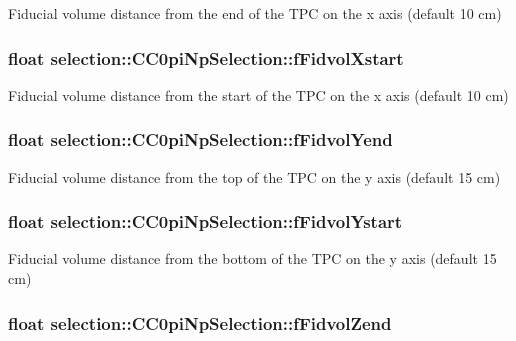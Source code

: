 Fiducial volume distance from the end of the T\-P\-C on the x axis (default 10 cm) \hypertarget{classselection_1_1CC0piNpSelection_a783e7f9dcd42c083658870f7d23931da}{
\subsubsection[{f\-Fidvol\-Xstart}]{\setlength{\rightskip}{0pt plus 5cm}float selection\-::\-C\-C0pi\-Np\-Selection\-::f\-Fidvol\-Xstart\hspace{0.3cm}{\ttfamily [private]}}}\label{classselection_1_1CC0piNpSelection_a783e7f9dcd42c083658870f7d23931da}
Fiducial volume distance from the start of the T\-P\-C on the x axis (default 10 cm) \hypertarget{classselection_1_1CC0piNpSelection_a4732dc1091cb1881c741d57f999b5035}{
\subsubsection[{f\-Fidvol\-Yend}]{\setlength{\rightskip}{0pt plus 5cm}float selection\-::\-C\-C0pi\-Np\-Selection\-::f\-Fidvol\-Yend\hspace{0.3cm}{\ttfamily [private]}}}\label{classselection_1_1CC0piNpSelection_a4732dc1091cb1881c741d57f999b5035}
Fiducial volume distance from the top of the T\-P\-C on the y axis (default 15 cm) \hypertarget{classselection_1_1CC0piNpSelection_ac59a66f695af8314018029e4480db16a}{
\subsubsection[{f\-Fidvol\-Ystart}]{\setlength{\rightskip}{0pt plus 5cm}float selection\-::\-C\-C0pi\-Np\-Selection\-::f\-Fidvol\-Ystart\hspace{0.3cm}{\ttfamily [private]}}}\label{classselection_1_1CC0piNpSelection_ac59a66f695af8314018029e4480db16a}
Fiducial volume distance from the bottom of the T\-P\-C on the y axis (default 15 cm) \hypertarget{classselection_1_1CC0piNpSelection_a9ac28bcb4ef95573d416dec35202b18e}{
\subsubsection[{f\-Fidvol\-Zend}]{\setlength{\rightskip}{0pt plus 5cm}float selection\-::\-C\-C0pi\-Np\-Selection\-::f\-Fidvol\-Zend\hspace{0.3cm}{\ttfamily [private]}}}\label{classselection_1_1CC0piNpSelection_a9ac28bcb4ef95573d416dec35202b18e}
